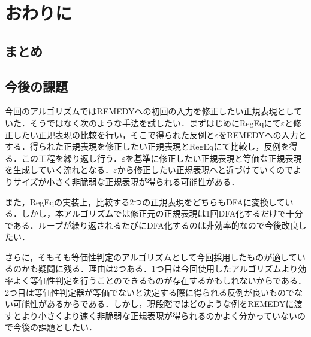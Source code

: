 \documentclass[a4paper, 12pt, dvipdfmx, uplatex]{jsreport}
\begin{document}
\chapter{おわりに}
\section{まとめ}


\section{今後の課題}
今回のアルゴリズムではREMEDYへの初回の入力を修正したい正規表現としていた．そうではなく次のような手法を試したい．まずはじめにRegEqにて$\varepsilon$と修正したい正規表現の比較を行い，そこで得られた反例と$\varepsilon$をREMEDYへの入力とする．得られた正規表現を修正したい正規表現とRegEqにて比較し，反例を得る．この工程を繰り返し行う．$\varepsilon$を基準に修正したい正規表現と等価な正規表現を生成していく流れとなる．$\varepsilon$から修正したい正規表現へと近づけていくのでよりサイズが小さく非脆弱な正規表現が得られる可能性がある．

また，RegEqの実装上，比較する2つの正規表現をどちらもDFAに変換している．しかし，本アルゴリズムでは修正元の正規表現は1回DFA化するだけで十分である．ループが繰り返されるたびにDFA化するのは非効率的なので今後改良したい．

さらに，そもそも等価性判定のアルゴリズムとして今回採用したものが適しているのかも疑問に残る．理由は2つある．1つ目は今回使用したアルゴリズムより効率よく等価性判定を行うことのできるものが存在するかもしれないからである．2つ目は等価性判定器が等価でないと決定する際に得られる反例が良いものでない可能性があるからである．しかし，現段階ではどのような例をREMEDYに渡すとより小さくより速く非脆弱な正規表現が得られるのかよく分かっていないので今後の課題としたい．



\end{document}

